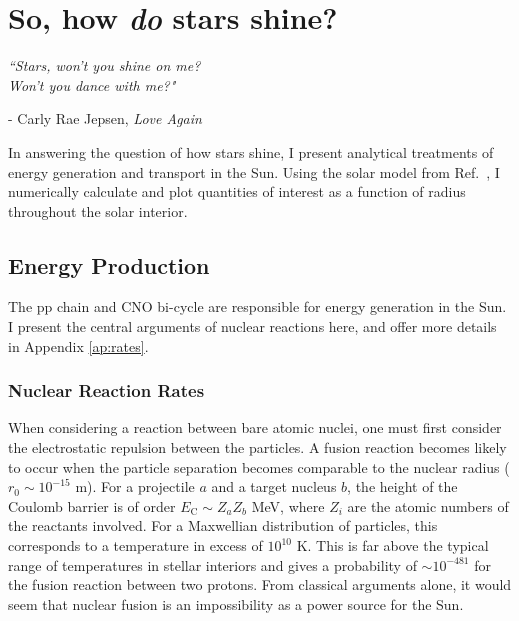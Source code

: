 \documentclass[12pt]{article}
\begin{document}
\section{So, how \textit{do} stars shine?} \label{sec:shine}
\begin{flushleft} \singlespacing \vspace{-0.25cm}
    \textit{``Stars, won't you shine on me?}\\
    \textit{Won't you dance with me?"} \\
\end{flushleft} 
\begin{flushright} \vspace{-0.5cm}
    - Carly Rae Jepsen, \textit{Love Again}
\end{flushright}
\doublespacing
%
In answering the question of how stars shine, I present analytical treatments of energy generation and transport in the Sun. Using the solar model from Ref.~\cite{Bahcall_2005}, I numerically calculate and plot quantities of interest as a function of radius throughout the solar interior.

\subsection{Energy Production}\label{sec:shine_production}
The pp chain and CNO bi-cycle are responsible for energy generation in the Sun. I present the central arguments of nuclear reactions here, and offer more details in Appendix \ref{ap:rates}.

\subsubsection{Nuclear Reaction Rates}
When considering a reaction between bare atomic nuclei, one must first consider the electrostatic repulsion between the particles. A fusion reaction becomes likely to occur when the particle separation becomes comparable to the nuclear radius ($r_0 \sim 10^{-15}$ m). For a projectile $a$ and a target nucleus $b$, the height of the Coulomb barrier is of order $ E_\mathrm{C} \sim Z_a Z_b$ MeV, where $Z_i$ are the atomic numbers of the reactants involved. For a Maxwellian distribution of particles, this corresponds to a temperature in excess of $10^{10}$ K. This is far above the typical range of temperatures in stellar interiors and gives a probability of $\sim 10^{-481}$ for the fusion reaction between two protons. From classical arguments alone, it would seem that nuclear fusion is an impossibility as a power source for the Sun.
\end{document}
